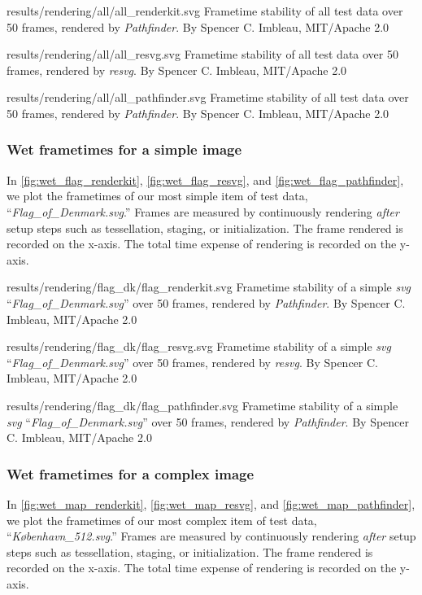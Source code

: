\widesvg
{results/rendering/all/all_renderkit.svg}
{Frametime stability of all test data over 50 frames, rendered by \textit{Pathfinder}.\label{fig:wet_all_renderkit}}
{By Spencer C. Imbleau, MIT/Apache 2.0}\medskip

\widesvg
{results/rendering/all/all_resvg.svg}
{Frametime stability of all test data over 50 frames, rendered by \textit{resvg}.\label{fig:wet_all_resvg}}
{By Spencer C. Imbleau, MIT/Apache 2.0}\medskip

\widesvg
{results/rendering/all/all_pathfinder.svg}
{Frametime stability of all test data over 50 frames, rendered by \textit{Pathfinder}.\label{fig:wet_all_pathfinder}}
{By Spencer C. Imbleau, MIT/Apache 2.0}

\subsubsection{Wet frametimes for a simple image}
In \cref{fig:wet_flag_renderkit}, \cref{fig:wet_flag_resvg}, and \cref{fig:wet_flag_pathfinder}, we plot the frametimes of our most simple item of test data, ``\textit{Flag\_of\_Denmark.svg}.'' Frames are measured by continuously rendering \emph{after} setup steps such as tessellation, staging, or initialization. The frame rendered is recorded on the x-axis. The total time expense of rendering is recorded on the y-axis.\medskip

\widesvg
{results/rendering/flag_dk/flag_renderkit.svg}
{Frametime stability of a simple \textit{svg} ``\textit{Flag\_of\_Denmark.svg}'' over 50 frames, rendered by \textit{Pathfinder}.\label{fig:wet_flag_renderkit}}
{By Spencer C. Imbleau, MIT/Apache 2.0}\medskip

\widesvg
{results/rendering/flag_dk/flag_resvg.svg}
{Frametime stability of a simple \textit{svg} ``\textit{Flag\_of\_Denmark.svg}'' over 50 frames, rendered by \textit{resvg}.\label{fig:wet_flag_resvg}}
{By Spencer C. Imbleau, MIT/Apache 2.0}\medskip

\widesvg
{results/rendering/flag_dk/flag_pathfinder.svg}
{Frametime stability of a simple \textit{svg} ``\textit{Flag\_of\_Denmark.svg}'' over 50 frames, rendered by \textit{Pathfinder}.\label{fig:wet_flag_pathfinder}}
{By Spencer C. Imbleau, MIT/Apache 2.0}


\subsubsection{Wet frametimes for a complex image}
In \cref{fig:wet_map_renderkit}, \cref{fig:wet_map_resvg}, and \cref{fig:wet_map_pathfinder}, we plot the frametimes of our most complex item of test data, ``\textit{København\_512.svg}.'' Frames are measured by continuously rendering \emph{after} setup steps such as tessellation, staging, or initialization. The frame rendered is recorded on the x-axis. The total time expense of rendering is recorded on the y-axis.\medskip

